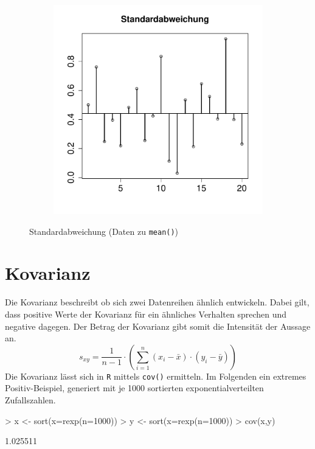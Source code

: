 \begin{figure}[h!]
\centering
\begin{subfigure}[b]{0.48\textwidth}
\includegraphics{begriffe-010}
\end{subfigure}
\caption{Standardabweichung (Daten zu \lstinline{mean()})}
\end{figure}

\section{Kovarianz}
Die \gls{Kovarianz} beschreibt ob sich zwei Datenreihen ähnlich 
entwickeln. Dabei gilt, dass positive Werte der Kovarianz für ein 
ähnliches Verhalten sprechen und negative dagegen. Der Betrag der 
Kovarianz gibt somit die Intensität der Aussage an. 
\[  
	s_{xy} 
	= \frac{1}{n-1} \cdot \left( 
		\sum_{i=1}^n (x_i - \bar{x}) \cdot (y_i - \bar{y})
	\right)
\]
Die Kovarianz lässt sich in \lstinline{R} mittels \lstinline{cov()}
ermitteln. Im Folgenden ein extremes Positiv-Beispiel, generiert mit 
je 1000 sortierten exponentialverteilten Zufallszahlen. 
\begin{Schunk}
\begin{Sinput}
> x <- sort(x=rexp(n=1000))
> y <- sort(x=rexp(n=1000))
> cov(x,y)
\end{Sinput}
\begin{Soutput}
[1] 1.025511
\end{Soutput}
\end{Schunk}


